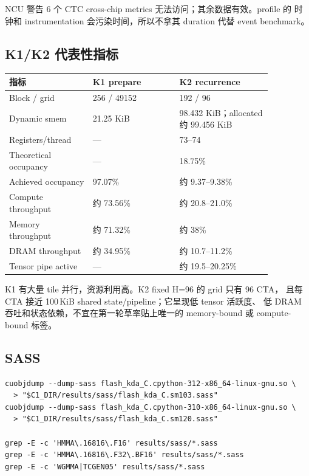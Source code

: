 \documentclass[11pt,a4paper,fontset=none]{ctexart}
\begin{document}
NCU 警告 6 个 CTC cross-chip metrics 无法访问；其余数据有效。profile 的
时钟和 instrumentation 会污染时间，所以不拿其 duration 代替 event benchmark。

\subsection{K1/K2 代表性指标}

\begin{longtable}{@{}L{0.27\linewidth}L{0.29\linewidth}L{0.30\linewidth}@{}}
\toprule
指标 & K1 prepare & K2 recurrence \\
\midrule
\endhead
\bottomrule
\endlastfoot
Block / grid & 256 / 49152 & 192 / 96 \\
Dynamic smem & 21.25 KiB & 98.432 KiB；allocated 约 99.456 KiB \\
Registers/thread & --- & 73--74 \\
Theoretical occupancy & --- & 18.75\% \\
Achieved occupancy & 97.07\% & 约 9.37--9.38\% \\
Compute throughput & 约 73.56\% & 约 20.8--21.0\% \\
Memory throughput & 约 71.32\% & 约 38\% \\
DRAM throughput & 约 34.95\% & 约 10.7--11.2\% \\
Tensor pipe active & --- & 约 19.5--20.25\% \\
\end{longtable}

K1 有大量 tile 并行，资源利用高。K2 fixed H=96 的 grid 只有 96 CTA，
且每 CTA 接近 100\,KiB shared state/pipeline；它呈现低 tensor 活跃度、
低 DRAM 吞吐和状态依赖，不宜在第一轮草率贴上唯一的 memory-bound 或
compute-bound 标签。

\subsection{SASS}

\begin{lstlisting}
cuobjdump --dump-sass flash_kda_C.cpython-312-x86_64-linux-gnu.so \
  > "$C1_DIR/results/sass/flash_kda_C.sm103.sass"
cuobjdump --dump-sass flash_kda_C.cpython-310-x86_64-linux-gnu.so \
  > "$C1_DIR/results/sass/flash_kda_C.sm120.sass"

grep -E -c 'HMMA\.16816\.F16' results/sass/*.sass
grep -E -c 'HMMA\.16816\.F32\.BF16' results/sass/*.sass
grep -E -c 'WGMMA|TCGEN05' results/sass/*.sass
\end{lstlisting}
\end{document}
